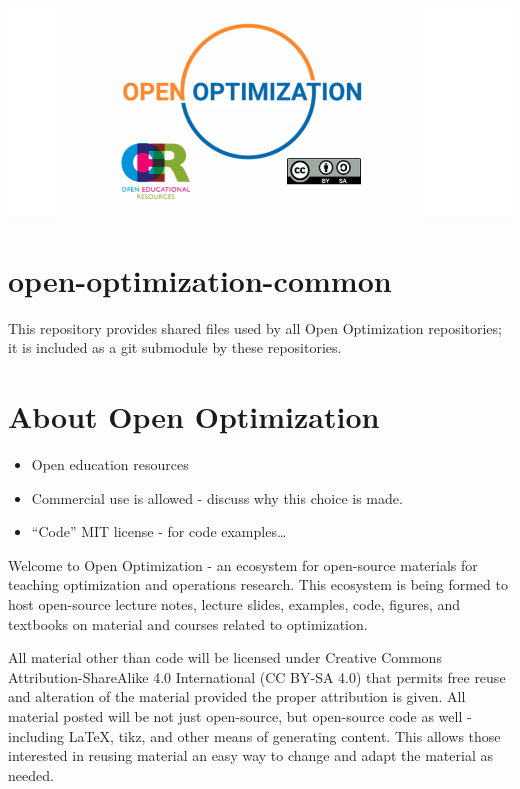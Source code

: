 \includegraphics{logos/logo-open-optimization-oer-wide.png}

\hypertarget{open-optimization-common}{%
\section{open-optimization-common}\label{open-optimization-common}}

This repository provides shared files used by all Open Optimization
repositories; it is included as a git submodule by these repositories.

\hypertarget{about-open-optimization}{%
\section{About Open Optimization}\label{about-open-optimization}}

\begin{itemize}
\tightlist
\item
  Open education resources
\item
  Commercial use is allowed - discuss why this choice is made.
\item
  ``Code'' MIT license - for code examples\ldots{}
\end{itemize}

Welcome to Open Optimization - an ecosystem for open-source materials
for teaching optimization and operations research. This ecosystem is
being formed to host open-source lecture notes, lecture slides,
examples, code, figures, and textbooks on material and courses related
to optimization.

All material other than code will be licensed under Creative Commons
Attribution-ShareAlike 4.0 International (CC BY-SA 4.0) that permits
free reuse and alteration of the material provided the proper
attribution is given. All material posted will be not just open-source,
but open-source code as well - including LaTeX, tikz, and other means of
generating content. This allows those interested in reusing material an
easy way to change and adapt the material as needed.

